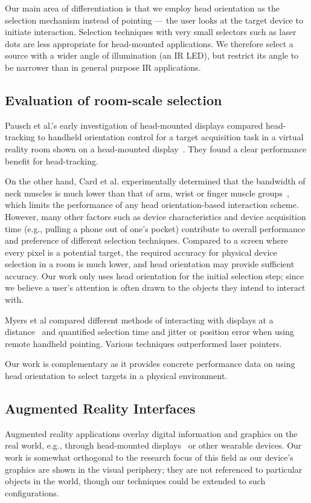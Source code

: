 \documentclass{sigchi}
\begin{document}
Our main area of differentiation is that we employ head orientation as the selection mechanism instead of pointing --- the user looks at the target device to initiate interaction. Selection techniques with very small selectors such as laser dots are less appropriate for head-mounted applications. We therefore select a source with a wider angle of illumination (an IR LED), but restrict its angle to be narrower than in general purpose IR applications.

\subsection{Evaluation of room-scale selection}
Pausch et al.'s early investigation of head-mounted displays compared head-tracking to handheld orientation control for a target acquisition task in a virtual reality room shown on a head-mounted display~\cite{pausch_user_1993}. They found a clear performance benefit for head-tracking.

On the other hand, Card et al. experimentally determined that the bandwidth of neck muscles is much lower than that of arm, wrist or finger muscle groups~\cite{card_morphological_1991}, which limits the performance of any head orientation-based interaction scheme. However, many other factors such as device characteristics and device acquisition time (e.g., pulling a phone out of one's pocket) contribute to overall performance and preference of different selection techniques.  Compared to a screen where every pixel is a potential target, the required accuracy for physical device selection in a room is much lower, and head orientation may provide sufficient accuracy. Our work only uses head orientation for the initial selection step; since we believe a user's attention is often drawn to the objects they intend to interact with. 

Myers et al compared different methods of interacting with displays at a distance~\cite{myers_interacting_2002} and quantified selection time and jitter or position error when using remote handheld pointing. Various techniques outperformed laser pointers. 

Our work is complementary as it provides concrete performance data on using head orientation to select targets in a physical environment.

\subsection{Augmented Reality Interfaces}
Augmented reality applications overlay digital information and graphics on the real world, e.g., through head-mounted displays~\cite{azuma_recent_2001} or other wearable devices. 
Our work is somewhat orthogonal to the research focus of this field as our device's graphics are shown in the visual periphery; they are not referenced to particular objects in the world, though our techniques could be extended to such configurations.
\end{document}
